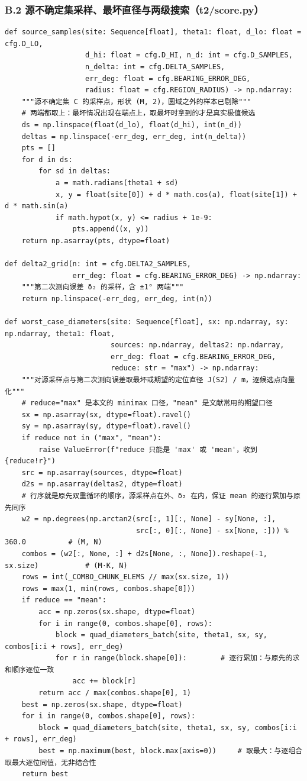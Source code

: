 \documentclass[UTF8, zihao=5,AutoFakeBold=2]{ctexart}
\begin{document}
	\subsubsection*{B.2 \quad 源不确定集采样、最坏直径与两级搜索（t2/score.py）}
	\begin{lstlisting}
def source_samples(site: Sequence[float], theta1: float, d_lo: float = cfg.D_LO,
                   d_hi: float = cfg.D_HI, n_d: int = cfg.D_SAMPLES,
                   n_delta: int = cfg.DELTA_SAMPLES,
                   err_deg: float = cfg.BEARING_ERROR_DEG,
                   radius: float = cfg.REGION_RADIUS) -> np.ndarray:
    """源不确定集 C 的采样点，形状 (M, 2)，圆域之外的样本已剔除"""
    # 两端都取上：最坏情况出现在端点上，取最坏时拿到的才是真实极值候选
    ds = np.linspace(float(d_lo), float(d_hi), int(n_d))
    deltas = np.linspace(-err_deg, err_deg, int(n_delta))
    pts = []
    for d in ds:
        for sd in deltas:
            a = math.radians(theta1 + sd)
            x, y = float(site[0]) + d * math.cos(a), float(site[1]) + d * math.sin(a)
            if math.hypot(x, y) <= radius + 1e-9:
                pts.append((x, y))
    return np.asarray(pts, dtype=float)

def delta2_grid(n: int = cfg.DELTA2_SAMPLES,
                err_deg: float = cfg.BEARING_ERROR_DEG) -> np.ndarray:
    """第二次测向误差 δ₂ 的采样，含 ±1° 两端"""
    return np.linspace(-err_deg, err_deg, int(n))

def worst_case_diameters(site: Sequence[float], sx: np.ndarray, sy: np.ndarray, theta1: float,
                         sources: np.ndarray, deltas2: np.ndarray,
                         err_deg: float = cfg.BEARING_ERROR_DEG,
                         reduce: str = "max") -> np.ndarray:
    """对源采样点与第二次测向误差取最坏或期望的定位直径 J(S2) / m，逐候选点向量化"""
    # reduce="max" 是本文的 minimax 口径，"mean" 是文献常用的期望口径
    sx = np.asarray(sx, dtype=float).ravel()
    sy = np.asarray(sy, dtype=float).ravel()
    if reduce not in ("max", "mean"):
        raise ValueError(f"reduce 只能是 'max' 或 'mean'，收到 {reduce!r}")
    src = np.asarray(sources, dtype=float)
    d2s = np.asarray(deltas2, dtype=float)
    # 行序就是原先双重循环的顺序，源采样点在外、δ₂ 在内，保证 mean 的逐行累加与原先同序
    w2 = np.degrees(np.arctan2(src[:, 1][:, None] - sy[None, :],
                               src[:, 0][:, None] - sx[None, :])) % 360.0          # (M, N)
    combos = (w2[:, None, :] + d2s[None, :, None]).reshape(-1, sx.size)           # (M·K, N)
    rows = int(_COMBO_CHUNK_ELEMS // max(sx.size, 1))
    rows = max(1, min(rows, combos.shape[0]))
    if reduce == "mean":
        acc = np.zeros(sx.shape, dtype=float)
        for i in range(0, combos.shape[0], rows):
            block = quad_diameters_batch(site, theta1, sx, sy, combos[i:i + rows], err_deg)
            for r in range(block.shape[0]):        # 逐行累加：与原先的求和顺序逐位一致
                acc += block[r]
        return acc / max(combos.shape[0], 1)
    best = np.zeros(sx.shape, dtype=float)
    for i in range(0, combos.shape[0], rows):
        block = quad_diameters_batch(site, theta1, sx, sy, combos[i:i + rows], err_deg)
        best = np.maximum(best, block.max(axis=0))     # 取最大：与逐组合取最大逐位同值，无非结合性
    return best


\end{lstlisting}
\end{document}
